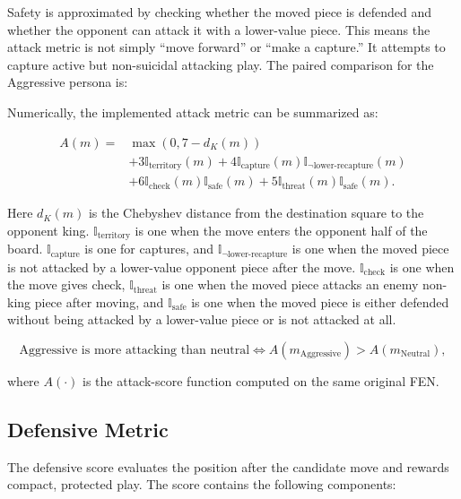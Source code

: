 \documentclass[10pt]{article}
\begin{document}
Safety is approximated by checking whether the moved piece is defended and whether the opponent can attack it with a lower-value piece. This means the attack metric is not simply ``move forward'' or ``make a capture.'' It attempts to capture active but non-suicidal attacking play. The paired comparison for the Aggressive persona is:

Numerically, the implemented attack metric can be summarized as:

\[
\begin{aligned}
A(m) ={}& \max(0, 7-d_K(m)) \\
&+ 3\mathbb{I}_{\text{territory}}(m)
+ 4\mathbb{I}_{\text{capture}}(m)\mathbb{I}_{\neg \text{lower-recapture}}(m)\\
&+ 6\mathbb{I}_{\text{check}}(m)\mathbb{I}_{\text{safe}}(m)
+ 5\mathbb{I}_{\text{threat}}(m)\mathbb{I}_{\text{safe}}(m).
\end{aligned}
\]

Here $d_K(m)$ is the Chebyshev distance from the destination square to the opponent king. $\mathbb{I}_{\text{territory}}$ is one when the move enters the opponent half of the board. $\mathbb{I}_{\text{capture}}$ is one for captures, and $\mathbb{I}_{\neg \text{lower-recapture}}$ is one when the moved piece is not attacked by a lower-value opponent piece after the move. $\mathbb{I}_{\text{check}}$ is one when the move gives check, $\mathbb{I}_{\text{threat}}$ is one when the moved piece attacks an enemy non-king piece after moving, and $\mathbb{I}_{\text{safe}}$ is one when the moved piece is either defended without being attacked by a lower-value piece or is not attacked at all.

\[
\text{Aggressive is more attacking than neutral} \iff
A(m_{\text{Aggressive}}) > A(m_{\text{Neutral}}),
\]

where $A(\cdot)$ is the attack-score function computed on the same original FEN.

\subsection{Defensive Metric}

The defensive score evaluates the position after the candidate move and rewards compact, protected play. The score contains the following components:
\end{document}
